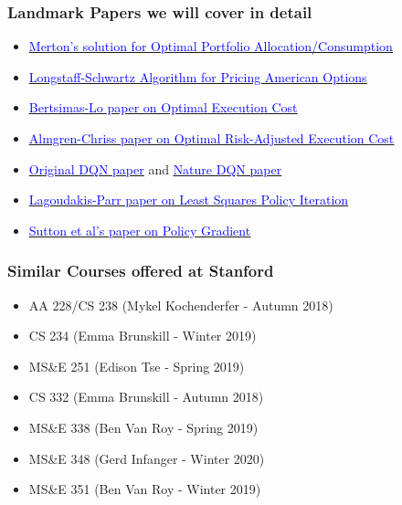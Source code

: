 \documentclass{beamer}
\begin{document}
\begin{frame}
\frametitle{Landmark Papers we will cover in detail}
\begin{itemize}
\item \href{https://www.jstor.org/stable/1926560}{\underline{\textcolor{blue}{Merton's solution for Optimal Portfolio Allocation/Consumption}}}
\item \href{https://people.math.ethz.ch/~hjfurrer/teaching/LongstaffSchwartzAmericanOptionsLeastSquareMonteCarlo.pdf}{\underline{\textcolor{blue}{Longstaff-Schwartz Algorithm for Pricing American Options}}}
\item \href{http://alo.mit.edu/wp-content/uploads/2015/06/Optimal-Control-of-Execution-Costs.pdf}{\underline{\textcolor{blue}{Bertsimas-Lo paper on Optimal Execution Cost}}}
\item \href{https://pdfs.semanticscholar.org/3d2d/773983c5201b58586af463f045befae5bbf2.pdf}{\underline{\textcolor{blue}{Almgren-Chriss paper on Optimal Risk-Adjusted Execution Cost}}}
\item \href{https://www.cs.toronto.edu/~vmnih/docs/dqn.pdf}{\underline{\textcolor{blue}{Original DQN paper}}} and \href{https://storage.googleapis.com/deepmind-media/dqn/DQNNaturePaper.pdf}{\underline{\textcolor{blue}{Nature DQN paper}}}
\item \href{http://www.jmlr.org/papers/volume4/lagoudakis03a/lagoudakis03a.pdf}{\underline{\textcolor{blue}{Lagoudakis-Parr paper on Least Squares Policy Iteration}}}
\item \href{http://papers.nips.cc/paper/1713-policy-gradient-methods-for-reinforcement-learning-with-function-approximation.pdf}{\underline{\textcolor{blue}{Sutton et al's paper on Policy Gradient}}}
\end{itemize}
\end{frame}


\begin{frame}
\frametitle{Similar Courses offered at Stanford}
\begin{itemize}
\item AA 228/CS 238 (Mykel Kochenderfer - Autumn 2018)
\item CS 234 (Emma Brunskill - Winter 2019)
\item MS\&E 251 (Edison Tse - Spring 2019)
\item CS 332 (Emma Brunskill - Autumn 2018)
\item MS\&E 338 (Ben Van Roy - Spring 2019)
\item MS\&E 348 (Gerd Infanger - Winter 2020)
\item MS\&E 351 (Ben Van Roy - Winter 2019)

\end{itemize}
\end{frame}
\end{document}
